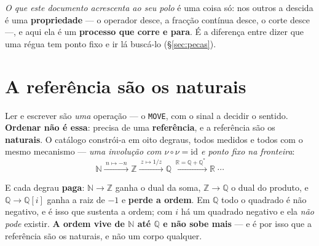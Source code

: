 \documentclass[11pt,a4paper]{article}
\newcommand{\N}{\ensuremath{\mathbb{N}}}
\newcommand{\Z}{\ensuremath{\mathbb{Z}}}
\newcommand{\Q}{\ensuremath{\mathbb{Q}}}
\newcommand{\R}{\ensuremath{\mathbb{R}}}
\begin{document}
\medskip
\noindent\emph{O que este documento acrescenta ao seu polo} é uma coisa só: nos outros a
descida é uma \textbf{propriedade} --- o operador desce, a fracção contínua desce, o corte
desce ---, e aqui ela é um \textbf{processo que corre e para}. É a diferença entre dizer
que uma régua tem ponto fixo e ir lá buscá-lo (\S\ref{sec:pecas}).

\begin{abstract}
\noindent \textbf{Ler e escrever são uma operação; ordenar não é essa} --- ela precisa de uma
\emph{referência}, e a referência são os \textbf{naturais}, construídos em oito degraus que são
todos involuções. \textbf{Uma sequência é uma régua}, e ordená-la é levá-la ao seu \textbf{ponto fixo} ---
a forma canónica --- de onde se converte para qualquer outra. É esse mapa entre réguas que aqui se
constrói e se valida, com as peças da teoria da dualidade: a \textbf{estaca} $x\mapsto x^{\dagger}$,
a \textbf{Lei 2} $-f=f^{-1}$, a \textbf{bidualidade} $J^{4}=\mathrm{id}$ e o \textbf{trial}. Nenhum
elemento é comparado com outro. \textbf{A permutação é o dual}, e guardá-la torna o processo
\emph{invertível}: a volta é exata e o apagamento é \textbf{zero}. O critério não é a lista sair
crescente --- é a volta fechar.
\end{abstract}

\section{A referência são os naturais}

Ler e escrever são \emph{uma} operação --- o \texttt{MOVE}, com o sinal a decidir o sentido.
\textbf{Ordenar não é essa}: precisa de uma \textbf{referência}, e a referência são os
\textbf{naturais}. O catálogo constrói-a em oito degraus, todos medidos e todos com o mesmo
mecanismo --- \emph{uma involução com $\nu\circ\nu=\mathrm{id}$ e ponto fixo na fronteira}:
\[
  \N \xrightarrow{\;n\mapsto-n\;} \Z
  \xrightarrow{\;z\mapsto 1/z\;} \Q
  \xrightarrow{\;\R=\Q+\Q^{*}\;} \R \;\cdots
\]

\noindent E cada degrau \textbf{paga}: $\N\to\Z$ ganha o dual da soma, $\Z\to\Q$ o dual do
produto, e $\Q\to\Q[i]$ ganha a raiz de $-1$ e \textbf{perde a ordem}. Em $\Q$ todo o quadrado é
não negativo, e é isso que sustenta a ordem; com $i$ há um quadrado negativo e ela \emph{não pode}
existir. \textbf{A ordem vive de $\N$ até $\Q$ e não sobe mais} --- e é por isso que a referência
são os naturais, e não um corpo qualquer.
\end{document}
